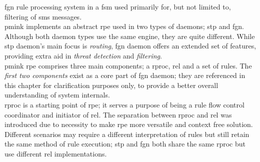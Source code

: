 \documentclass[a4paper,latin]{paper}
\begin{document}
\clearpage
\noindent{}\acrfull{fgn} rule processing system in a \acrfull{fsm} used primarily for, but not limited to, filtering of
\acrfull{sms} messages.\\

\acrfull{pmink} implements an abstract \acrfull{rpe} used in two types of \glspl{daemon}; 
\acrfull{stp} and \acrfull{fgn}. Although both \gls{daemon} types use the same engine, they are quite different. While \acrshort{stp} \gls{daemon}'s
main focus is \textit{\gls{routing}}, \acrshort{fgn} \gls{daemon} offers an extended set of features, providing extra aid in \textit{\gls{threat} detection} 
and \textit{filtering}.\\

\acrshort{pmink} \acrfull{rpe} comprises three main components; a \acrfull{rproc}, \acrfull{rel}  and a set of \glspl{rule}. The \textit{first two components}
exist as a core part of \acrshort{fgn} \gls{daemon}; they are referenced in this chapter for clarification purposes only, to provide a better overall understanding
of system internals.\\

\acrlong{rproc} is a starting point of \acrlong{rpe}; it serves a purpose of being a \gls{rule} flow control coordinator and initiator of \acrlong{rel}. The separation
between \acrlong{rproc} and \acrlong{rel} was introduced due to necessity to make \acrlong{rpe} more versatile and context free solution. Different scenarios may require 
a different interpretation of \glspl{rule} but still retain the same method of \gls{rule} execution; \acrfull{stp} and \acrfull{fgn} both share the same \acrfull{rproc} but use 
different \acrfull{rel} implementations.\\
\end{document}
